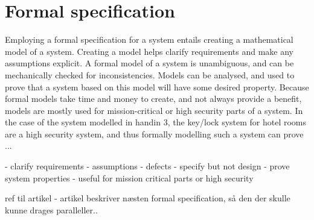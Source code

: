 \documentclass[Main]{subfiles}
\begin{document}
\section{Formal specification}

Employing a formal specification for a system entails creating a mathematical model of a system. Creating a model helps clarify requirements and make any assumptions explicit. A formal model of a system is unambiguous, and can be mechanically checked for inconsistencies. Models can be analysed, and used to prove that a system based on this model will have some desired property. Because formal models take time and money to create, and not always provide a benefit, models are mostly used for mission-critical or high security parts of a system. In the case of the system modelled in handin 3\parencite[1-5]{HI3}, the key/lock system for hotel rooms are a high security system, and thus formally modelling such a system can prove ...


- clarify requirements
- assumptions
- defects
- specify but not design
- prove system properties
- useful for mission critical parts or high security

ref til artikel - artikel beskriver næsten formal specification, så den der skulle kunne drages paralleller..
\end{document}
